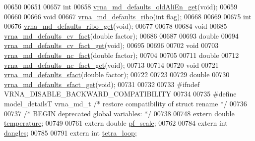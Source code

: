 \begin{DoxyCode}
00650 
00651 
00657 \textcolor{keywordtype}{int}
00658 \hyperlink{group__model__details_ga2374492b5019df88022fe4c05f0f3630}{vrna\_md\_defaults\_oldAliEn\_get}(\textcolor{keywordtype}{void});
00659 
00660 
00666 \textcolor{keywordtype}{void}
00667 \hyperlink{group__model__details_ga937c45e1d06fd6168730a9b08d130be3}{vrna\_md\_defaults\_ribo}(\textcolor{keywordtype}{int} flag);
00668 
00669 
00675 \textcolor{keywordtype}{int}
00676 \hyperlink{group__model__details_ga169027f0c0561ea7d87b655e4b336bfc}{vrna\_md\_defaults\_ribo\_get}(\textcolor{keywordtype}{void});
00677 
00678 
00684 \textcolor{keywordtype}{void}
00685 \hyperlink{group__model__details_gad3a3f40baafd91a6ce80a91a68e20053}{vrna\_md\_defaults\_cv\_fact}(\textcolor{keywordtype}{double} factor);
00686 
00687 
00693 \textcolor{keywordtype}{double}
00694 \hyperlink{group__model__details_gae59c68393807217b0a2497adb64d3ee3}{vrna\_md\_defaults\_cv\_fact\_get}(\textcolor{keywordtype}{void});
00695 
00696 
00702 \textcolor{keywordtype}{void}
00703 \hyperlink{group__model__details_gac35e596c850dce3ad55c49119fd7d471}{vrna\_md\_defaults\_nc\_fact}(\textcolor{keywordtype}{double} factor);
00704 
00705 
00711 \textcolor{keywordtype}{double}
00712 \hyperlink{group__model__details_ga7ac759eaa7159bf5f022745f5da59508}{vrna\_md\_defaults\_nc\_fact\_get}(\textcolor{keywordtype}{void});
00713 
00714 
00720 \textcolor{keywordtype}{void}
00721 \hyperlink{group__model__details_ga3f73d3029d3d0025d4cc311510cd95a3}{vrna\_md\_defaults\_sfact}(\textcolor{keywordtype}{double} factor);
00722 
00723 
00729 \textcolor{keywordtype}{double}
00730 \hyperlink{group__model__details_gab2df6aab954b63fd3592d18e90285dae}{vrna\_md\_defaults\_sfact\_get}(\textcolor{keywordtype}{void});
00731 
00732 
00733 \textcolor{preprocessor}{#ifndef VRNA\_DISABLE\_BACKWARD\_COMPATIBILITY}
00734 
00735 \textcolor{preprocessor}{#define model\_detailsT        vrna\_md\_t               }\textcolor{comment}{/* restore compatibility of struct rename */}\textcolor{preprocessor}{}
00736 
00737 \textcolor{comment}{/* BEGIN deprecated global variables: */}
00738 
00748 \textcolor{keyword}{extern} \textcolor{keywordtype}{double} \hyperlink{group__model__details_a5f7e5c2b65bada5188443470e576aa4b}{temperature};
00749 
00761 \textcolor{keyword}{extern} \textcolor{keywordtype}{double} \hyperlink{group__model__details_gad3b22044065acc6dee0af68931b52cfd}{pf\_scale};
00762 
00784 \textcolor{keyword}{extern} \textcolor{keywordtype}{int} \hyperlink{group__model__details_adcda4ff2ea77748ae0e8700288282efc}{dangles};
00785 
00791 \textcolor{keyword}{extern} \textcolor{keywordtype}{int} \hyperlink{group__model__details_ga4f6265bdf0ead7ff4628a360adbfd77e}{tetra\_loop};

\end{DoxyCode}
